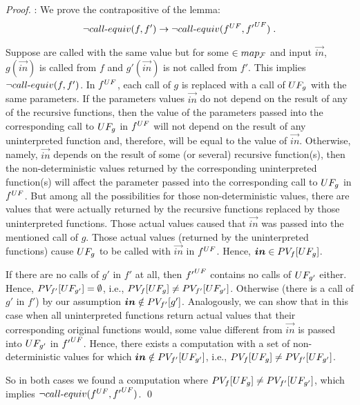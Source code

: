 \begin{proof}: We prove the contrapositive of the lemma:
\[\lnot call\mbox{-}equiv(f,f') \rightarrow \lnot call\mbox{-}equiv({f}^{UF},{f'}^{UF})\;.\]

Suppose  are called with the same
value but for some $\in map_{\cal F}$ and input $\vec{in}$, $g(\vec{in})$ is called from $f$ and $g'(\vec{in})$ is not called from $f'$. This implies $\lnot call\mbox{-}equiv(f,f')$. %
In ${f}^{UF}$, each call of $g$ is replaced with a call of
$UF_{g}$ with the same parameters. If the parameters values $\vec{in}$ do not depend on the result of any of the recursive functions, then the value of the parameters passed into the corresponding call
to $UF_{g}$ in ${f}^{UF}$ will not depend on the result of any
uninterpreted function and, therefore, will be equal to the value of $\vec{in}$.
Otherwise, namely, $\vec{in}$ depends on the result of some (or several) recursive
function(s), then the non-deterministic values returned by the corresponding uninterpreted
function(s) will affect the parameter passed into the corresponding call
to $UF_{g}$ in ${f}^{UF}$. But among all the possibilities for those
non-deterministic values, there are values that were actually returned by
the recursive functions replaced by those uninterpreted functions. Those
actual values caused that $\vec{in}$ was passed into the mentioned call of
$g$. Those actual values (returned by the uninterpreted functions) cause
$UF_{g}$ to be called with $\vec{in}$ in ${f}^{UF}$. Hence,
$\vec{in}\in\ufp{g}$.

If there are no calls of $g'$ in $f'$ at all, then ${f'}^{UF}$ contains
no calls of $UF_{g'}$ either. Hence, $PV_{f'}[UF_{g'}]=\emptyset$, i.e.,
$PV_f[UF_{g}]\neq PV_{f'}[UF_{g'}]$. Otherwise (there is a call of $g'$ in $f'$)
by our assumption $\vec{in} \notin \ufpdefp{g'}$. Analogously, we can show
that in this case when all uninterpreted functions return actual values
that their corresponding original functions would, some value different
from $\vec{in}$ is passed into $UF_{g'}$ in ${f'}^{UF}$. Hence, there
exists a computation with a set of non-deterministic values for which
$\vec{in}\notin\ufpp{g'}$, i.e., $PV_f[UF_{g}]\neq PV_{f'}[UF_{g'}]$.

So in both cases we found a computation where $PV_f[UF_{g}]\neq PV_{f'}[UF_{g'}]$, which implies $\lnot call\mbox{-}equiv({f}^{UF},{f'}^{UF})$. \qed \end{proof}

